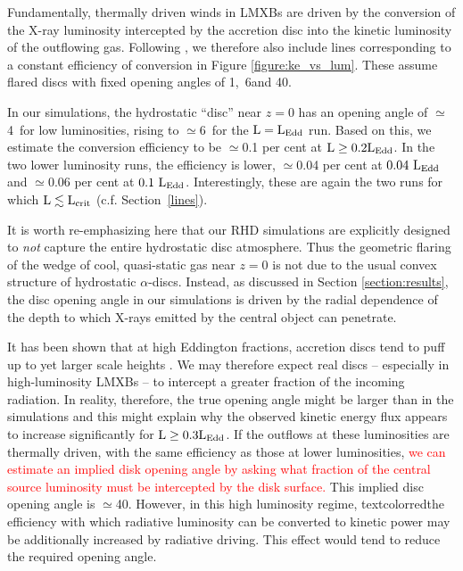 \documentclass[a4paper,fleqn,usenatbib]{mnras}
\begin{document}
Fundamentally, thermally driven winds
in LMXBs are driven by the conversion of the X-ray luminosity
intercepted by the accretion disc into the kinetic luminosity of the
outflowing gas. Following \citep{2016AN....337..512P}, we therefore
also include lines corresponding to a
constant efficiency of conversion  in Figure \ref{figure:ke_vs_lum}. These 
assume flared discs with fixed
opening angles of 1\degree,~6\degree and 40\degree.

In our simulations, the hydrostatic ``disc'' near $z =
0$ has an opening angle of $\simeq$4\degree~for low luminosities,
rising to $\simeq$6\degree~for  the $\rm{L=L_{Edd}}$ run. Based on
this, we estimate the conversion efficiency to be 
$\simeq$0.1 per cent at $\rm{L \geq 0.2L_{Edd}}$. In the two lower
luminosity runs, the efficiency is lower, $\simeq$0.04 per cent at
$\rm{0.04~L_{Edd}}$ and $\simeq$0.06 per cent at
$\rm{0.1~L_{Edd}}$. Interestingly, these are again the two runs for
which $\rm{ L \lesssim L_{crit}}$ (c.f. Section~\ref{lines}).

It is worth re-emphasizing here that our RHD simulations are
explicitly designed to {\em not} capture the entire hydrostatic disc
atmosphere. Thus the geometric flaring of the wedge of cool,
quasi-static gas near $z=0$ is not due to the usual convex structure
of hydrostatic $\alpha$-discs. Instead, as discussed
in Section \ref{section:results}, the disc opening angle in our simulations
is driven by the radial dependence of the depth to which X-rays
emitted by the central object can penetrate.

It has been shown that at high Eddington
fractions,  accretion discs tend to puff up to yet larger scale heights
\citep[][but also see
\citealt{2016A&A...587A..13L}]{1988ApJ...332..646A,2005MNRAS.357..295O}. We
may therefore expect real discs -- especially in high-luminosity LMXBs
-- to intercept a greater fraction of the incoming radiation. 
In reality, therefore, the true opening angle might be larger than in
the simulations and this
might explain why the observed kinetic energy flux appears to increase
significantly for $\rm{L \geq 0.3L_{Edd}}$. If the outflows at these
luminosities are thermally driven, with the same efficiency as those
at lower luminosities, \textcolor{red}{we can estimate an implied disk 
opening angle by asking what fraction of the central source luminosity
must be intercepted by the disk surface.} This implied disc opening angle is
$\simeq$40\degree. However, in this high luminosity regime,
textcolor{red}{the efficiency with which radiative luminosity can be
converted to kinetic power may be additionally increased by radiative
driving. This effect would tend to reduce the required opening angle.}
\end{document}
